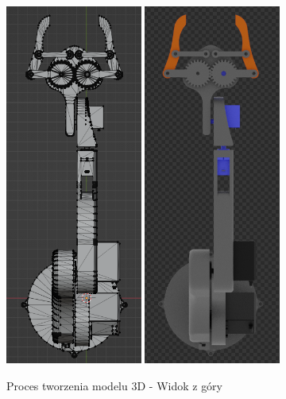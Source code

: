 \documentclass[11pt,titlepage,a4paper]{article}
\begin{document}
\begin{figure}[p]
    \begin{center}
        \includegraphics[width=0.4\textwidth]{img/topW.png}
        \includegraphics[width=0.4\textwidth]{img/topC.png}
    \end{center}
    \caption{Proces tworzenia modelu 3D - Widok z góry}
    \label{Modelowanie3Dtop}
\end{figure}
\end{document}

